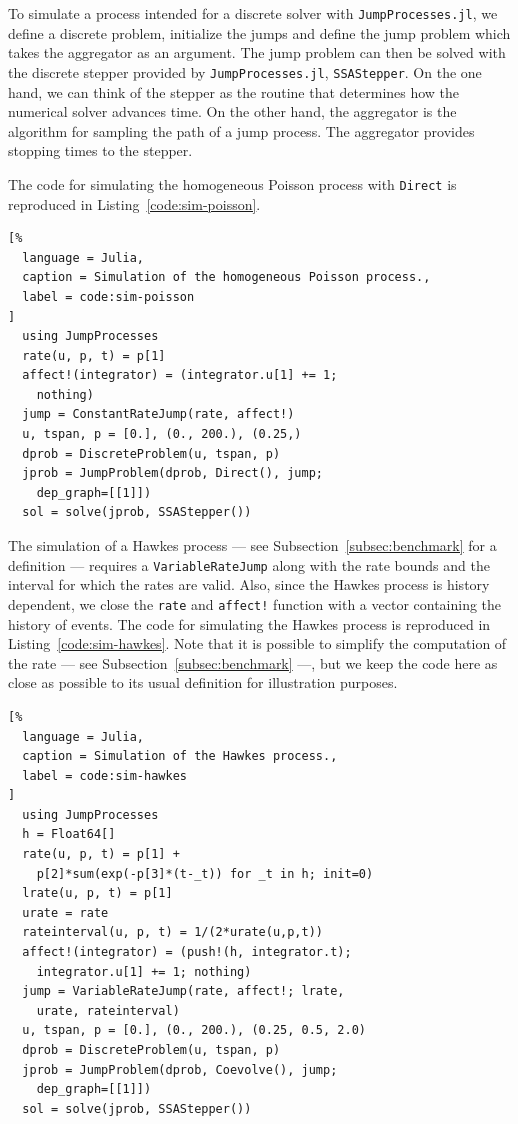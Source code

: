 \documentclass{juliacon}
\numberwithin{equation}{section}
\begin{document}
To simulate a process intended for a discrete solver with \texttt{JumpProcesses.jl}, we define a discrete problem, initialize the jumps and define the jump problem which takes the aggregator as an argument. The jump problem can then be solved with the discrete stepper provided by \texttt{JumpProcesses.jl}, \texttt{SSAStepper}. On the one hand, we can think of the stepper as the routine that determines how the numerical solver advances time. On the other hand, the aggregator is the algorithm for sampling the path of a jump process. The aggregator provides stopping times to the stepper.

The code for simulating the homogeneous Poisson process with \texttt{Direct} is reproduced in Listing~\ref{code:sim-poisson}.

\begin{lstlisting}[%
  language = Julia,
  caption = Simulation of the homogeneous Poisson process.,
  label = code:sim-poisson
]
  using JumpProcesses
  rate(u, p, t) = p[1]
  affect!(integrator) = (integrator.u[1] += 1;
    nothing)
  jump = ConstantRateJump(rate, affect!)
  u, tspan, p = [0.], (0., 200.), (0.25,)
  dprob = DiscreteProblem(u, tspan, p)
  jprob = JumpProblem(dprob, Direct(), jump;
    dep_graph=[[1]])
  sol = solve(jprob, SSAStepper())
\end{lstlisting}

The simulation of a Hawkes process --- see Subsection~\ref{subsec:benchmark} for a definition --- requires a \texttt{VariableRateJump} along with the rate bounds and the interval for which the rates are valid. Also, since the Hawkes process is history dependent, we close the \texttt{rate} and \texttt{affect!} function with a vector containing the history of events. The code for simulating the Hawkes process is reproduced in Listing~\ref{code:sim-hawkes}. Note that it is possible to simplify the computation of the rate --- see Subsection~\ref{subsec:benchmark} ---, but we keep the code here as close as possible to its usual definition for illustration purposes.

\begin{lstlisting}[%
  language = Julia,
  caption = Simulation of the Hawkes process.,
  label = code:sim-hawkes
]
  using JumpProcesses
  h = Float64[]
  rate(u, p, t) = p[1] +
    p[2]*sum(exp(-p[3]*(t-_t)) for _t in h; init=0)
  lrate(u, p, t) = p[1]
  urate = rate
  rateinterval(u, p, t) = 1/(2*urate(u,p,t))
  affect!(integrator) = (push!(h, integrator.t);
    integrator.u[1] += 1; nothing)
  jump = VariableRateJump(rate, affect!; lrate,
    urate, rateinterval)
  u, tspan, p = [0.], (0., 200.), (0.25, 0.5, 2.0)
  dprob = DiscreteProblem(u, tspan, p)
  jprob = JumpProblem(dprob, Coevolve(), jump;
    dep_graph=[[1]])
  sol = solve(jprob, SSAStepper())
\end{lstlisting}
\end{document}
